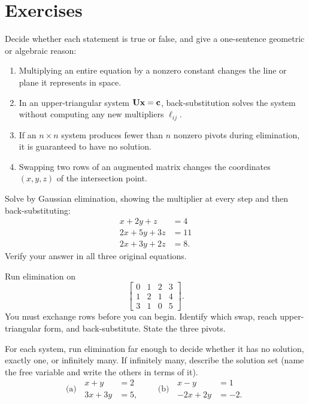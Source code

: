 \section{Exercises}

\begin{exercise}
Decide whether each statement is true or false, and give a one-sentence geometric or algebraic reason:
\begin{enumerate}[label=(\alph*)]
  \item Multiplying an entire equation by a nonzero constant changes the line or plane it represents in space.
  \item In an upper-triangular system $\mathbf{U}\mathbf{x} = \mathbf{c}$, back-substitution solves the system without computing any new multipliers $\ell_{ij}$.
  \item If an $n \times n$ system produces fewer than $n$ nonzero pivots during elimination, it is guaranteed to have no solution.
  \item Swapping two rows of an augmented matrix changes the coordinates $(x, y, z)$ of the intersection point.
\end{enumerate}
\end{exercise}

\begin{exercise}
Solve by Gaussian elimination, showing the multiplier at every step and then
back-substituting:
\[
\begin{aligned}
x + 2y + z &= 4\\
2x + 5y + 3z &= 11\\
2x + 3y + 2z &= 8.
\end{aligned}
\]
Verify your answer in all three original equations.
\end{exercise}

\begin{exercise}
Run elimination on
\[
\left[\begin{array}{ccc|c}
0 & 1 & 2 & 3\\
1 & 2 & 1 & 4\\
3 & 1 & 0 & 5
\end{array}\right].
\]
You must exchange rows before you can begin. Identify which swap, reach
upper-triangular form, and back-substitute. State the three pivots.
\end{exercise}

\begin{exercise}
For each system, run elimination far enough to decide whether it has no solution,
exactly one, or infinitely many. If infinitely many, describe the solution set
(name the free variable and write the others in terms of it).
\[
\text{(a)}\;\;
\begin{aligned}
x + y &= 2\\
3x + 3y &= 5,
\end{aligned}
\qquad
\text{(b)}\;\;
\begin{aligned}
x - y &= 1\\
-2x + 2y &= -2.
\end{aligned}
\]
\end{exercise}

